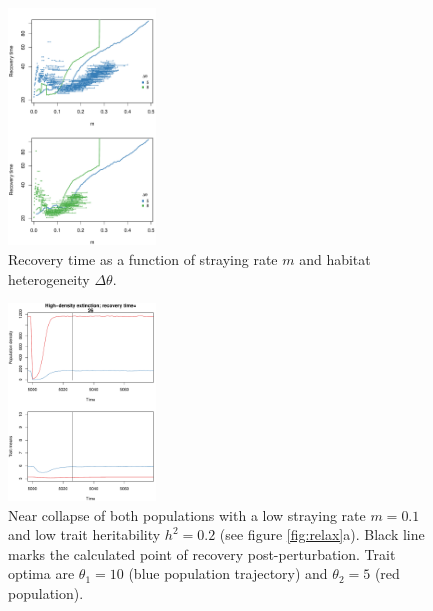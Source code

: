 \documentclass[twocolumn,preprintnumbers,amsmath,amssymb,superscriptaddress]{revtex4}
\begin{document}
\begin{figure}
  \captionsetup{justification=raggedright,
singlelinecheck=false
}
\centering
\includegraphics[width=0.35\textwidth]{figs2/fig_relaxtheta.pdf}
\caption{
Recovery time as a function of straying rate $m$ and habitat heterogeneity $\Delta\theta$.
} \label{fig:relaxtheta}
\end{figure}

\begin{figure}
  \captionsetup{justification=raggedright,
singlelinecheck=false
}
\centering
\includegraphics[width=0.35\textwidth]{figs2/fig_relax_both_lowh.pdf}
\caption{
Near collapse of both populations with a low straying rate $m=0.1$ and low trait heritability $h^2=0.2$ (see figure \ref{fig:relax}a).
Black line marks the calculated point of recovery post-perturbation.
Trait optima are $\theta_1 = 10$ (blue population trajectory) and $\theta_2 = 5$ (red population).
} \label{fig:relaxtraj_bothlh}
\end{figure}
\end{document}
